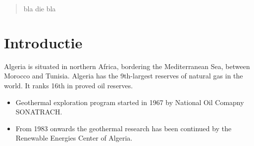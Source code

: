 \documentclass[a0,portrait]{a0poster}
\begin{document}
\vspace{1cm} %


\begin{multicols}{3} %


\color{Navy} %

\begin{abstract}
bla die bla
\end{abstract}

\color{Black} %
\section*{Introductie}
Algeria is situated in \cite{Block_2011} northern Africa, bordering the Mediterranean Sea, between Morocco and Tunisia. Algeria has the 9th-largest reserves of natural gas in the world. It ranks 16th in proved oil reserves.  
\begin{itemize}
\item Geothermal exploration program started in 1967 by National Oil Comapny SONATRACH.
\item From 1983 onwards the geothermal research has been continued by the Renewable Energies Center of Algeria.
\end{itemize}

\color{Black} %


\end{multicols}
\end{document}
